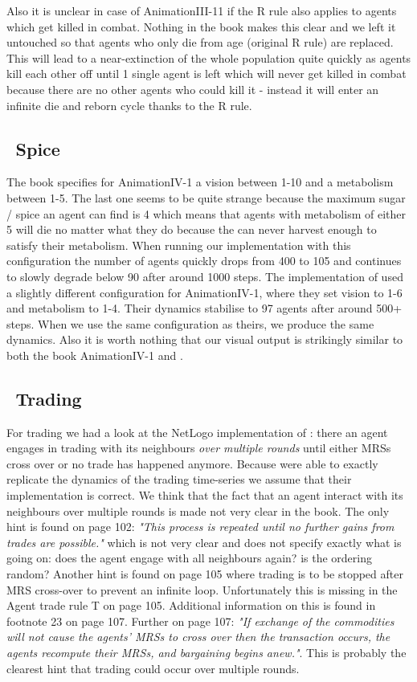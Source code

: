 Also it is unclear in case of AnimationIII-11 if the R rule also applies to agents which get killed in combat. Nothing in the book makes this clear and we left it untouched so that agents who only die from age (original R rule) are replaced. This will lead to a near-extinction of the whole population quite quickly as agents kill each other off until 1 single agent is left which will never get killed in combat because there are no other agents who could kill it - instead it will enter an infinite die and  reborn cycle thanks to the R rule.

\subsection{\, Spice}
The book specifies for AnimationIV-1 a vision between 1-10 and a metabolism between 1-5. The last one seems to be quite strange because the maximum sugar / spice an agent can find is 4 which means that agents with metabolism of either 5 will die no matter what they do because the can never harvest enough to satisfy their metabolism. When running our implementation with this configuration the number of agents quickly drops from 400 to 105 and continues to slowly degrade below 90 after around 1000 steps.
The implementation of \cite{weaver_replicating_2009} used a slightly different configuration for AnimationIV-1, where they set vision to 1-6 and metabolism to 1-4. Their dynamics stabilise to 97 agents after around 500+ steps. When we use the same configuration as theirs, we produce the same dynamics.
Also it is worth nothing that our visual output is strikingly similar to both the book AnimationIV-1 and \cite{weaver_replicating_2009}.

\subsection{\, Trading}
For trading we had a look at the NetLogo implementation of \cite{weaver_replicating_2009}: there an agent engages in trading with its neighbours \textit{over multiple rounds} until either MRSs cross over or no trade has happened anymore. Because \cite{weaver_replicating_2009} were able to exactly replicate the dynamics of the trading time-series we assume that their implementation is correct. We think that the fact that an agent interact with its neighbours over multiple rounds is made not very clear in the book. The only hint is found on page 102: \textit{"This process is repeated until no further gains from trades are possible."} which is not very clear and does not specify exactly what is going on: does the agent engage with all neighbours again? is the ordering random? Another hint is found on page 105 where trading is to be stopped after MRS cross-over to prevent an infinite loop. Unfortunately this is missing in the Agent trade rule T on page 105. Additional information on this is found in footnote 23 on page 107. Further on page 107: \textit{"If exchange of the commodities will not cause the agents' MRSs to cross over then the transaction occurs, the agents recompute their MRSs, and bargaining begins anew."}. This is probably the clearest hint that trading could occur over multiple rounds.

